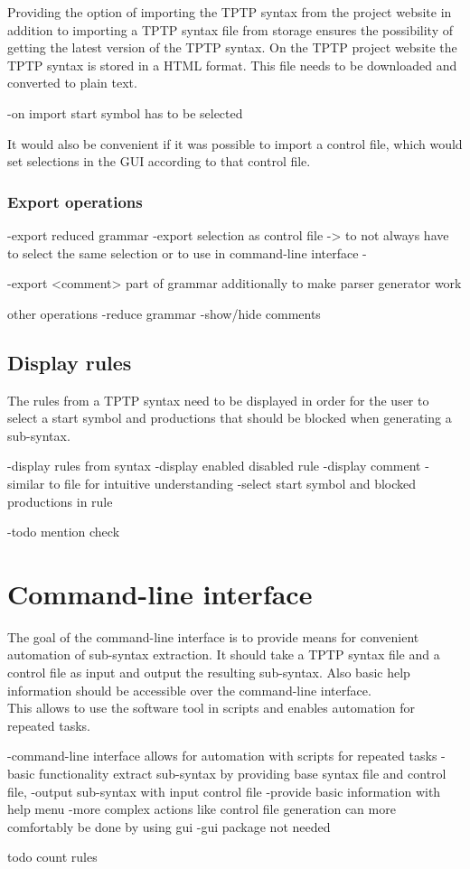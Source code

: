 Providing the option of importing the \ac{TPTP} syntax from the project website in addition to importing a \ac{TPTP} syntax file from storage ensures the possibility of getting the latest version of the \ac{TPTP} syntax.
On the \ac{TPTP} project website the \ac{TPTP} syntax is stored in a HTML format. This file needs to be downloaded and converted to plain text.

-on import start symbol has to be selected

It would also be convenient if it was possible to import a control file, which would set selections in the GUI according to that control file.
\subsubsection{Export operations}
-export reduced grammar
-export selection as control file -> to not always have to select the same selection or to use in command-line interface
-

-export <comment> part of grammar additionally to make parser generator work

other operations
-reduce grammar
-show/hide comments
\subsection{Display rules}\label{sec:ConceptRulesDisplay}
The rules from a \ac{TPTP} syntax need to be displayed in order for the user to select a start symbol and productions that should be blocked when generating a sub-syntax.

-display rules from syntax
-display enabled disabled rule
-display comment
-similar to file for intuitive understanding
-select start symbol and blocked productions in rule

-todo mention check
\section{Command-line interface}\label{sec:ConceptCommandLineInterface}
The goal of the command-line interface is to provide means for convenient automation of sub-syntax extraction. It should take a \ac{TPTP} syntax file and a control file as input and output the resulting sub-syntax. Also basic help information should be accessible over the command-line interface.\\
This allows to use the software tool in scripts and enables automation for repeated tasks.


-command-line interface allows for automation with scripts for repeated tasks
-basic functionality extract sub-syntax by providing base syntax file and control file, 
-output sub-syntax with input control file
-provide basic information with help menu
-more complex actions like control file generation can more comfortably be done by using gui
-gui package not needed





todo count rules